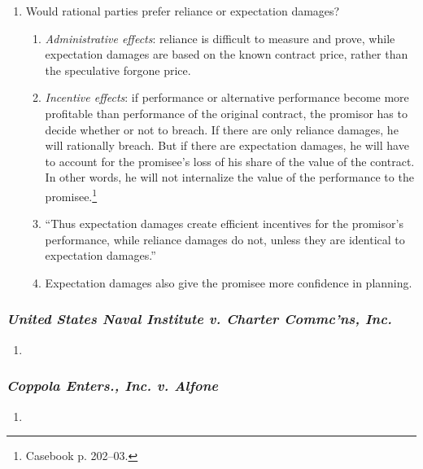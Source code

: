 \begin{enumerate}
\begin{enumerate}
        conditions.''\footnote{Casebook p. 202.}
        \item Would rational parties prefer reliance or expectation damages?
        \begin{enumerate}
            \item \emph{Administrative effects}: reliance is difficult to 
            measure and prove, while expectation damages are based on the 
            known contract price, rather than the speculative forgone price.
            \item \emph{Incentive effects}: if performance or alternative 
            performance become more profitable than performance of the 
            original contract, the promisor has to decide whether or not to 
            breach. If there are only reliance damages, he will rationally 
            breach. But if there are expectation damages, he will have to 
            account for the promisee's loss of his share of the value of the 
            contract. In other words, he will not internalize the value of the 
            performance to the promisee.\footnote{Casebook p. 202--03.}
            \item ``Thus expectation damages create efficient incentives for 
            the promisor's performance, while reliance damages do not, unless 
            they are identical to expectation damages.''
            \item Expectation damages also give the promisee more confidence 
            in planning.
        \end{enumerate}
    \end{enumerate}
\end{enumerate}

\subsubsection{\emph{United States Naval Institute v. Charter Commc'ns, Inc.}}

\begin{enumerate}
    \item %
\end{enumerate}

\subsubsection{\emph{Coppola Enters., Inc. v. Alfone}}

\begin{enumerate}
    \item %
\end{enumerate}


